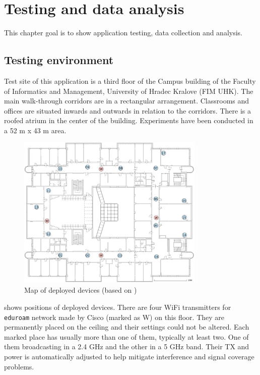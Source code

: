 \chapter{Testing and data analysis}\label{sec:TestingAndDataAnalysis}
This chapter goal is to show application testing, data collection and analysis.

\section{Testing environment}\label{sec:TestingEnvironment}
Test site of this application is a third floor of the Campus building of the Faculty of Informatics and Management, University of Hradec Kralove (FIM UHK). The main walk-through corridors are in a rectangular arrangement. Classrooms and offices are situated inwards and outwards in relation to the corridors. There is a roofed atrium in the center of the building. Experiments have been conducted in a 52 m x 43 m area.

\begin{figure}[H]
	\begin{centering}
		\includegraphics[width=0.8\textwidth]{img/j3np}
		\par\end{centering}
	\caption{Map of deployed devices (based on \cite{IILUBLEB})}
	\label{fig01c06}
\end{figure}

 shows positions of deployed devices. There are four WiFi transmitters for \verb|eduroam| network made by Cisco (marked as W) on this floor. They are permanently placed on the ceiling and their settings could not be altered. Each marked place has usually more than one of them, typically at least two. One of them broadcasting in a 2.4 GHz and the other in a 5 GHz band. Their TX and power is automatically adjusted to help mitigate interference and signal coverage problems.

